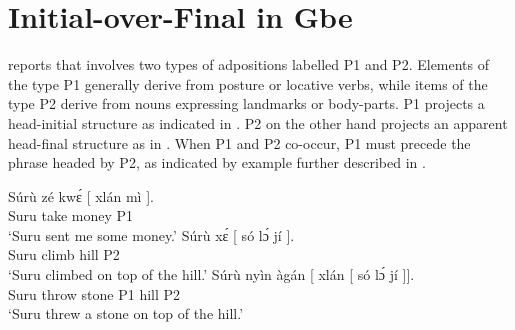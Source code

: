 \documentclass[output=paper]{langsci/langscibook}
\begin{document}
\section{Initial-over-Final in Gbe}

\citet{Aboh2010c} reports that  involves two types of adpositions
labelled P1 and P2. Elements of the type P1 generally derive from posture or
locative verbs, while items of the type P2 derive from nouns expressing
landmarks or body-parts. P1 projects a head-initial structure as indicated in
. P2 on the other hand projects an apparent head-final
structure as in . When P1 and P2 co-occur, P1 must precede
the phrase headed by P2, as indicated by example  further
described in .

\ea\label{ex:aboh:14.6} 
    \ea\label{ex:aboh:14.6a}
        \gll    Súrù zé kw\'ɛ [ xlán mì ]. \\
                Suru take money {} P1 \Fsg{} {} \\
        \glt    \enquote*{Suru sent me some money.}
    \ex\label{ex:aboh:14.6b}
        \gll    Súrù x\'ɛ [ só l\'ɔ jí ]. \\
                Suru climb {} hill \Det{} P2 {} \\
        \glt    \enquote*{Suru climbed on top of the hill.}
    \ex\label{ex:aboh:14.6c}
        \gll    Súrù nyìn àgán [ xlán [ só l\'ɔ jí ]]. \\
                Suru throw stone {} P1 {} hill \Det{} P2 {} \\
        \glt    \enquote*{Suru threw a stone on top of the hill.}
    \ex\label{ex:aboh:14.6d}
    \z
\z
\end{document}
